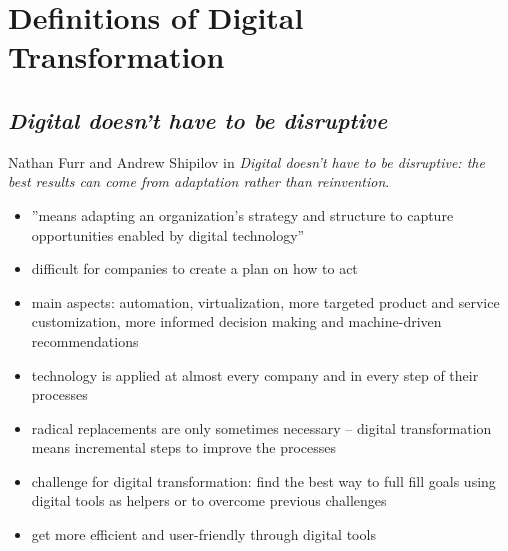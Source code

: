 \documentclass[a4]{scrartcl}
\begin{document}
	\section{Definitions of Digital Transformation} \label{sec:Sec1}







	\subsection{\textit{Digital doesn't have to be disruptive}} \label{disruptive}
	
	Nathan Furr and Andrew Shipilov in \textit{Digital doesn't have to be disruptive: the best results can come from adaptation rather than reinvention}. \cite{disruptive}
	
	\begin{itemize}
		\item ''means adapting an organization's strategy and structure to capture opportunities enabled by digital technology'' \cite[p. 96]{disruptive}
		\item difficult for companies to create a plan on how to act
		\item main aspects: automation, virtualization, more targeted product and service customization, more informed decision making and machine-driven recommendations
		\item technology is applied at almost every company and in every step of their processes
		\item radical replacements are only sometimes necessary -- digital transformation means incremental steps to improve the processes
		\item challenge for digital transformation: find the best way to full fill goals using digital tools as helpers or to overcome previous challenges
		\item  get more efficient and user-friendly through digital tools
	\end{itemize}
\end{document}
